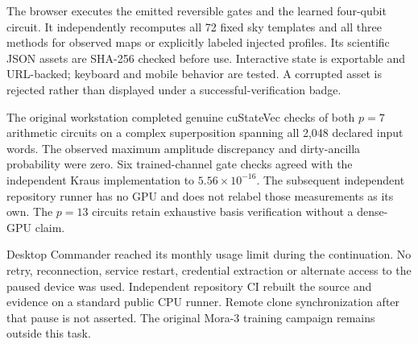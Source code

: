 \documentclass[11pt,oneside,openany]{book}
\begin{document}
The browser executes the emitted reversible gates and the learned four-qubit circuit. It independently recomputes all 72 fixed sky templates and all three methods for observed maps or explicitly labeled injected profiles. Its scientific JSON assets are SHA-256 checked before use. Interactive state is exportable and URL-backed; keyboard and mobile behavior are tested. A corrupted asset is rejected rather than displayed under a successful-verification badge.

The original workstation completed genuine cuStateVec checks of both $p=7$ arithmetic circuits on a complex superposition spanning all 2,048 declared input words. The observed maximum amplitude discrepancy and dirty-ancilla probability were zero. Six trained-channel gate checks agreed with the independent Kraus implementation to $5.56\times10^{-16}$. The subsequent independent repository runner has no GPU and does not relabel those measurements as its own. The $p=13$ circuits retain exhaustive basis verification without a dense-GPU claim.

Desktop Commander reached its monthly usage limit during the continuation. No retry, reconnection, service restart, credential extraction or alternate access to the paused device was used. Independent repository CI rebuilt the source and evidence on a standard public CPU runner. Remote clone synchronization after that pause is not asserted. The original Mora-3 training campaign remains outside this task.
\end{document}
